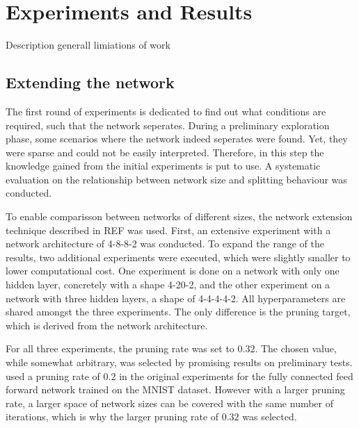 \chapter{Experiments and Results}
Description generall
limiations of work

\section{Extending the network}
The first round of experiments is dedicated to find out what conditions are required, such that the network seperates.
During a preliminary exploration phase, some scenarios where the network indeed seperates were found.
Yet, they were sparse and could not be easily interpreted.
Therefore, in this step the knowledge gained from the initial experiments is put to use.
A systematic evaluation on the relationship between network size and splitting behaviour was conducted.

To enable comparisson between networks of different sizes, the network extension technique described in REF was used.
First, an extensive experiment with a network architecture of 4-8-8-2 was conducted.
To expand the range of the results, two additional experiments were executed, which were slightly smaller to lower computational cost.
One experiment is done on a network with only one hidden layer, concretely with a shape 4-20-2, and the other experiment on a network with three hidden layers, a shape of 4-4-4-4-2.
All hyperparameters are shared amongst the three experiments.
The only difference is the pruning target, which is derived from the network architecture.

For all three experiments, the pruning rate was set to $0.32$.
The chosen value, while somewhat arbitrary, was selected by promising results on preliminary tests.
\textcite{DBLP:conf/iclr/FrankleC19} used a pruning rate of $0.2$ in the original experiments for the fully connected feed forward network trained on the MNIST dataset.
However with a larger pruning rate, a larger space of network sizes can be covered with the same number of iterations, which is why the larger pruning rate of $0.32$ was selected.

